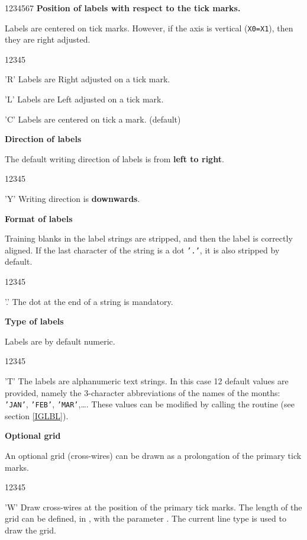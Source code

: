 \begin{DLtt}{1234567}
{\bf Position of labels with respect to the tick marks. }
 
Labels are centered on tick marks. However,
if the axis is vertical ({\tt X0=X1}), then they are right adjusted.
\begin{DLtt}{12345}
\item['R'] Labels are Right adjusted on a tick mark.
\item['L'] Labels are Left adjusted on a tick mark.
\item['C'] Labels are centered on tick a mark. (default)
\end{DLtt}
 
{\bf Direction of labels }
 
The default writing direction of labels is from {\bf left to right}.
\begin{DLtt}{12345}
\item['Y'] Writing direction is {\bf downwards}.
\end{DLtt}
 
{\bf Format of labels }
 
Training blanks in the label strings are stripped, and then the label is
correctly aligned. If the last character of the string is a dot {\tt'.'},
it is also stripped by default.
\begin{DLtt}{12345}
\item['.'] The dot at the end of a string is mandatory.
\end{DLtt}
 
{\bf Type of labels }
 
Labels are by default numeric.
\begin{DLtt}{12345}
\item['T'] The labels are alphanumeric text strings. In this case 12 default
           values are provided, namely the 3-character abbreviations of the
           names of the months: {\tt'JAN'}, {\tt'FEB'}, {\tt'MAR'},\ldots.
           These values can be modified by calling the routine 
           (see section \ref{IGLBL}).
\end{DLtt}
 
{\bf Optional grid }
 
An optional grid (cross-wires) can be drawn as a prolongation of the primary
tick marks.
\begin{DLtt}{12345}
\item['W'] Draw cross-wires at the position of the primary tick marks.
           The length of the grid can be defined, in \WC, with the
            parameter . The current line type
           is used to draw the grid.
\end{DLtt}
 

\end{DLtt}

